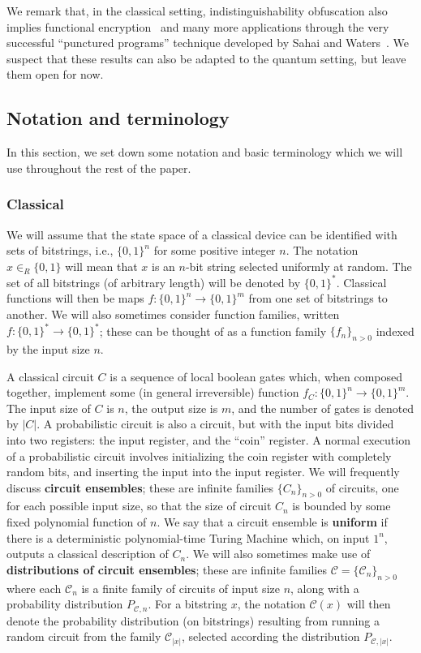 \documentclass[envcountsame]{llncs}
\numberwithin{equation}{section}
\newcommand{\inrand}{\in_R}
\begin{document}
We remark that, in the classical setting, indistinguishability obfuscation also implies functional encryption~\cite{GGHRSW13} and many more applications through the very successful ``punctured programs'' technique developed by Sahai and Waters~\cite{SW14}. We suspect that these results can also be adapted to the quantum setting, but leave them open for now.

\subsection{Notation and terminology}\label{sec:notation}

In this section, we set down some notation and basic terminology which we will use throughout the rest of the paper.

\subsubsection{Classical}

We will assume that the state space of a classical device can be identified with sets of bitstrings, i.e., $\{0, 1\}^n$ for some positive integer $n$. The notation $x \inrand \{0, 1\}$ will mean that $x$ is an $n$-bit string selected uniformly at random. The set of all bitstrings (of arbitrary length) will be denoted by $\{0, 1\}^*$. Classical functions will then be maps $f : \{0, 1\}^n \rightarrow \{0, 1\}^m$ from one set of bitstrings to another. We will also sometimes consider function families, written $f : \{0, 1\}^* \rightarrow \{0, 1\}^*$; these can be thought of as a function family $\{f_n\}_{n>0}$ indexed by the input size $n$. 

A classical circuit $C$ is a sequence of local boolean gates which, when composed together, implement some (in general irreversible) function $f_C: \{0, 1\}^n \rightarrow \{0, 1\}^m$. The input size of $C$ is $n$, the output size is $m$, and the number of gates is denoted by $|C|$. A probabilistic circuit is also a circuit, but with the input bits divided into two registers: the input register, and the ``coin'' register. A normal execution of a probabilistic circuit involves initializing the coin register with completely random bits, and inserting the input into the input register. We will frequently discuss \textbf{circuit ensembles}; these are infinite families $\{C_n\}_{n > 0}$ of circuits, one for each possible input size, so that the size of circuit $C_n$ is bounded by some fixed polynomial function of $n$.  We say that a circuit ensemble is \textbf{uniform} if there is a deterministic polynomial-time Turing Machine which, on input $1^n$, outputs a classical description of $C_n$.  We will also sometimes make use of \textbf{distributions of circuit ensembles}; these are infinite families $\mathcal C = \{\mathcal C_n\}_{n > 0}$ where each $\mathcal C_n$ is a finite family of circuits of input size $n$, along with a probability distribution $P_{\mathcal C, n}$. For a bitstring $x$, the notation $\mathcal C(x)$ will then denote the probability distribution (on bitstrings) resulting from running a random circuit from the family $\mathcal C_{|x|}$, selected according the distribution $P_{\mathcal C, |x|}$.
\end{document}

